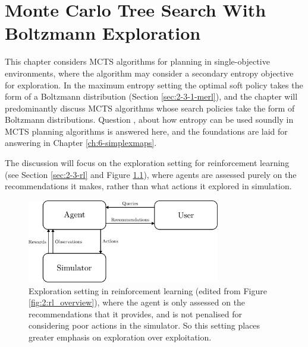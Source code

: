 

\chapter{\label{ch:4-dents}Monte Carlo Tree Search With Boltzmann Exploration} 

    \minitoc

    This chapter considers MCTS algorithms for planning in single-objective environments, where the algorithm may consider a secondary entropy objective for exploration. In the maximum entropy setting the optimal soft policy takes the form of a Boltzmann distribution (Section \ref{sec:2-3-1-merl}), and the chapter will predominantly discuss MCTS algorithms whose search policies take the form of Boltzmann distributions. Question \entropyq, about how entropy can be used soundly in MCTS planning algorithms is answered here, and the foundations are laid for answering \contextq\ewe in Chapter \ref{ch:6-simplexmaps}.
    
    The discussion will focus on the exploration setting for reinforcement learning (see Section \ref{sec:2-3-rl} and Figure \ref{fig:4:rl_overview}), where agents are assessed purely on the recommendations it makes, rather than what actions it explored in simulation.
    
    \begin{figure}
        \centering\includegraphics[width=0.75\textwidth]{figures/ch4/rl_overview.pdf} 
        \caption[Exploration setting in reinforcement learning.]{Exploration setting in reinforcement learning (edited from Figure \ref{fig:2:rl_overview}), where the agent is only assessed on the recommendations that it provides, and is not penalised for considering poor actions in the simulator. So this setting places greater emphasis on exploration over exploitation.}
        \label{fig:4:rl_overview}
    \end{figure}
    
